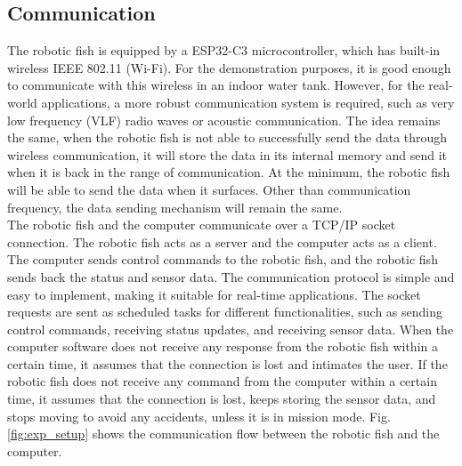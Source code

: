 \documentclass[12pt, draftclsnofoot, onecolumn]{IEEEtran}
\begin{document}
\subsection{Communication}
The robotic fish is equipped by a ESP32-C3 microcontroller, which has built-in wireless IEEE 802.11 (Wi-Fi). For the demonstration purposes, it is good enough to communicate with this wireless in an indoor water tank. However, for the real-world applications, a more robust communication system is required, such as very low frequency (VLF) radio waves or acoustic communication. The idea remains the same, when the robotic fish is not able to successfully send the data through wireless communication, it will store the data in its internal memory and send it when it is back in the range of communication. At the minimum, the robotic fish will be able to send the data when it surfaces. Other than communication frequency, the data sending mechanism will remain the same.\\
The robotic fish and the computer communicate over a TCP/IP socket connection. The robotic fish acts as a server and the computer acts as a client. The computer sends control commands to the robotic fish, and the robotic fish sends back the status and sensor data. The communication protocol is simple and easy to implement, making it suitable for real-time applications. The socket requests are sent as scheduled tasks for different functionalities, such as sending control commands, receiving status updates, and receiving sensor data. When the computer software does not receive any response from the robotic fish within a certain time, it assumes that the connection is lost and intimates the user. If the robotic fish does not receive any command from the computer within a certain time, it assumes that the connection is lost, keeps storing the sensor data, and stops moving to avoid any accidents, unless it is in mission mode. Fig. \ref{fig:exp_setup} shows the communication flow between the robotic fish and the computer.
\end{document}
